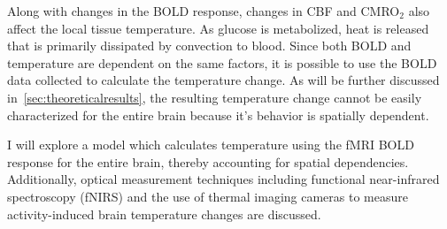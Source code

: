 Along with changes in the BOLD response, changes in CBF and CMRO$_2$ also affect the local tissue temperature.  As glucose is metabolized, heat is released that is primarily dissipated by convection to blood.  Since both BOLD and temperature are dependent on the same factors, it is possible to use the BOLD data collected to calculate the temperature change.  As will be further discussed in~\cref{sec:theoreticalresults}, the resulting temperature change cannot be easily characterized for the entire brain because it's behavior is spatially dependent.

I will explore a model which calculates temperature using the fMRI BOLD response for the entire brain, thereby accounting for spatial dependencies.  Additionally, optical measurement techniques including functional near-infrared spectroscopy (fNIRS) and the use of thermal imaging cameras to measure activity-induced brain temperature changes are discussed.